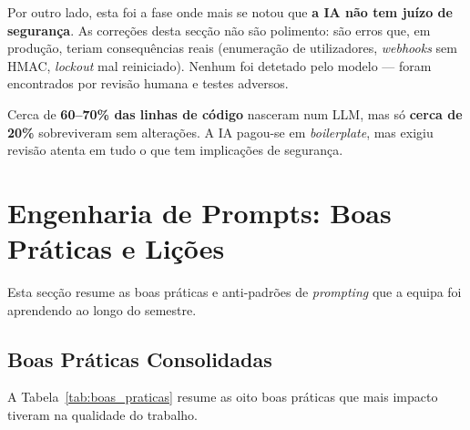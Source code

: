 Por outro lado, esta foi a fase onde mais se notou que \textbf{a IA não tem juízo de segurança}. As correções desta secção não são polimento: são erros que, em produção, teriam consequências reais (enumeração de utilizadores, \textit{webhooks} sem HMAC, \textit{lockout} mal reiniciado). Nenhum foi detetado pelo modelo --- foram encontrados por revisão humana e testes adversos.

Cerca de \textbf{60--70\% das linhas de código} nasceram num LLM, mas só \textbf{cerca de 20\%} sobreviveram sem alterações. A IA pagou-se em \textit{boilerplate}, mas exigiu revisão atenta em tudo o que tem implicações de segurança.

\section{Engenharia de Prompts: Boas Práticas e Lições}\label{sec:ia_prompts}

Esta secção resume as boas práticas e anti-padrões de \textit{prompting} que a equipa foi aprendendo ao longo do semestre.

\subsection{Boas Práticas Consolidadas}\label{subsec:ia_prompts_boas}

A Tabela~\ref{tab:boas_praticas} resume as oito boas práticas que mais impacto tiveram na qualidade do trabalho.

